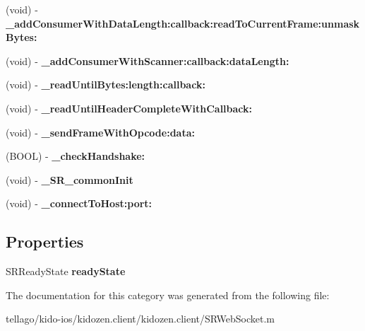 \begin{DoxyCompactItemize}
\item 
\hypertarget{category_s_r_web_socket_07_08_ab19f01545efb579607dd3de95afd1d23}{(void) -\/ {\bfseries \-\_\-add\-Consumer\-With\-Data\-Length\-:callback\-:read\-To\-Current\-Frame\-:unmask\-Bytes\-:}}\label{category_s_r_web_socket_07_08_ab19f01545efb579607dd3de95afd1d23}

\item 
\hypertarget{category_s_r_web_socket_07_08_afc26895aa91d81ea8b0674f8f15cba58}{(void) -\/ {\bfseries \-\_\-add\-Consumer\-With\-Scanner\-:callback\-:data\-Length\-:}}\label{category_s_r_web_socket_07_08_afc26895aa91d81ea8b0674f8f15cba58}

\item 
\hypertarget{category_s_r_web_socket_07_08_a1861cf9a0e140102fb57200f751f22f9}{(void) -\/ {\bfseries \-\_\-read\-Until\-Bytes\-:length\-:callback\-:}}\label{category_s_r_web_socket_07_08_a1861cf9a0e140102fb57200f751f22f9}

\item 
\hypertarget{category_s_r_web_socket_07_08_aa96c9f5352a5b330c573d5aa913e023f}{(void) -\/ {\bfseries \-\_\-read\-Until\-Header\-Complete\-With\-Callback\-:}}\label{category_s_r_web_socket_07_08_aa96c9f5352a5b330c573d5aa913e023f}

\item 
\hypertarget{category_s_r_web_socket_07_08_a85c2b9241b942350dd6c7ce1378a2415}{(void) -\/ {\bfseries \-\_\-send\-Frame\-With\-Opcode\-:data\-:}}\label{category_s_r_web_socket_07_08_a85c2b9241b942350dd6c7ce1378a2415}

\item 
\hypertarget{category_s_r_web_socket_07_08_ae940150f31a965f5552e0b4cf20215bb}{(B\-O\-O\-L) -\/ {\bfseries \-\_\-check\-Handshake\-:}}\label{category_s_r_web_socket_07_08_ae940150f31a965f5552e0b4cf20215bb}

\item 
\hypertarget{category_s_r_web_socket_07_08_af06b07a538ad70d0a54afe5aec530ace}{(void) -\/ {\bfseries \-\_\-\-S\-R\-\_\-common\-Init}}\label{category_s_r_web_socket_07_08_af06b07a538ad70d0a54afe5aec530ace}

\item 
\hypertarget{category_s_r_web_socket_07_08_ac9efbb050ed759fc933667bd8cb51949}{(void) -\/ {\bfseries \-\_\-connect\-To\-Host\-:port\-:}}\label{category_s_r_web_socket_07_08_ac9efbb050ed759fc933667bd8cb51949}

\end{DoxyCompactItemize}
\subsection*{Properties}
\begin{DoxyCompactItemize}
\item 
\hypertarget{category_s_r_web_socket_07_08_a4a139d2adb53cbbbf78cc8d60501cbc0}{S\-R\-Ready\-State {\bfseries ready\-State}}\label{category_s_r_web_socket_07_08_a4a139d2adb53cbbbf78cc8d60501cbc0}

\end{DoxyCompactItemize}


The documentation for this category was generated from the following file\-:\begin{DoxyCompactItemize}
\item 
tellago/kido-\/ios/kidozen.\-client/kidozen.\-client/S\-R\-Web\-Socket.\-m\end{DoxyCompactItemize}
